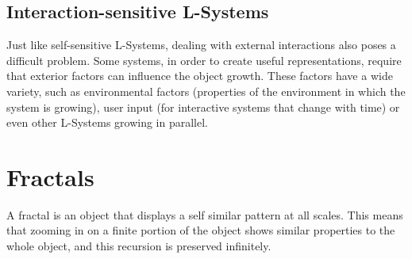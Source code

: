 \documentclass{acmtog}
\begin{document}
\subsection{Interaction-sensitive L-Systems}
\label{subsec:interactionsensitive}

Just like self-sensitive L-Systems, dealing with external interactions also poses a difficult problem. Some systems, in order to create useful representations, require that exterior factors can influence the object growth. These factors have a wide variety, such as environmental factors (properties of the environment in which the system is growing), user input (for interactive systems that change with time) or even other L-Systems growing in parallel.

\section{Fractals}
\label{sec:fractals}

A fractal is an object that displays a self similar pattern at all scales. This means that zooming in on a finite portion of the object shows similar properties to the whole object, and this recursion is preserved infinitely.
\end{document}
